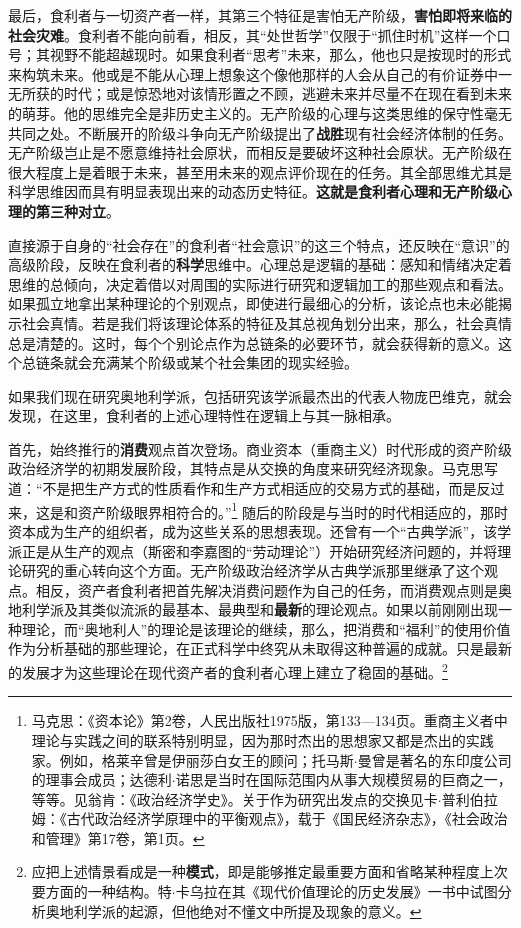 \documentclass[fontset=fandol, a4paper, 12pt, openright]{ctexbook}
\begin{document}
最后，食利者与一切资产者一样，其第三个特征是害怕无产阶级，\textbf{害怕即将来临的社会灾难}。食利者不能向前看，相反，其“处世哲学”仅限于“抓住时机”这样一个口号；其视野不能超越现时。如果食利者“思考”未来，那么，他也只是按现时的形式来构筑未来。他或是不能从心理上想象这个像他那样的人会从自己的有价证券中一无所获的时代；或是惊恐地对该情形置之不顾，逃避未来并尽量不在现在看到未来的萌芽。他的思维完全是非历史主义的。无产阶级的心理与这类思维的保守性毫无共同之处。不断展开的阶级斗争向无产阶级提出了\textbf{战胜}现有社会经济体制的任务。无产阶级岂止是不愿意维持社会原状，而相反是要破坏这种社会原状。无产阶级在很大程度上是着眼于未来，甚至用未来的观点评价现在的任务。其全部思维尤其是科学思维因而具有明显表现出来的动态历史特征。\textbf{这就是食利者心理和无产阶级心理的第三种对立}。

直接源于自身的“社会存在”的食利者“社会意识”的这三个特点，还反映在“意识”的高级阶段，反映在食利者的\textbf{科学}思维中。心理总是逻辑的基础：感知和情绪决定着思维的总倾向，决定着借以对周围的实际进行研究和逻辑加工的那些观点和看法。如果孤立地拿出某种理论的个别观点，即使进行最细心的分析，该论点也未必能揭示社会真情。若是我们将该理论体系的特征及其总视角划分出来，那么，社会真情总是清楚的。这时，每个个别论点作为总链条的必要环节，就会获得新的意义。这个总链条就会充满某个阶级或某个社会集团的现实经验。

如果我们现在研究奥地利学派，包括研究该学派最杰出的代表人物庞巴维克，就会发现，在这里，食利者的上述心理特性在逻辑上与其一脉相承。

首先，始终推行的\textbf{消费}观点首次登场。商业资本（重商主义）时代形成的资产阶级政治经济学的初期发展阶段，其特点是从交换的角度来研究经济现象。马克思写道：“不是把生产方式的性质看作和生产方式相适应的交易方式的基础，而是反过来，这是和资产阶级眼界相符合的。”\footnote{马克思：《资本论》第2卷，人民出版社1975版，第133—134页。重商主义者中理论与实践之间的联系特别明显，因为那时杰出的思想家又都是杰出的实践家。例如，格莱辛曾是伊丽莎白女王的顾问；托马斯$\cdot$曼曾是著名的东印度公司的理事会成员；达德利$\cdot$诺思是当时在国际范围内从事大规模贸易的巨商之一，等等。见翁肯：《政治经济学史》。关于作为研究出发点的交换见卡$\cdot$普利伯拉姆：《古代政治经济学原理中的平衡观点》，载于《国民经济杂志》，《社会政治和管理》第17卷，第1页。} 随后的阶段是与当时的时代相适应的，那时资本成为生产的组织者，成为这些关系的思想表现。还曾有一个“古典学派”，该学派正是从生产的观点（斯密和李嘉图的“劳动理论”）开始研究经济问题的，并将理论研究的重心转向这个方面。无产阶级政治经济学从古典学派那里继承了这个观点。相反，资产者食利者把首先解决消费问题作为自己的任务，而消费观点则是奥地利学派及其类似流派的最基本、最典型和\textbf{最新}的理论观点。如果以前刚刚出现一种理论，而“奥地利人”的理论是该理论的继续，那么，把消费和“福利”的使用价值作为分析基础的那些理论，在正式科学中终究从未取得这种普遍的成就。只是最新的发展才为这些理论在现代资产者的食利者心理上建立了稳固的基础。\footnote{应把上述情景看成是一种\textbf{模式}，即是能够推定最重要方面和省略某种程度上次要方面的一种结构。特$\cdot$卡乌拉在其《现代价值理论的历史发展》一书中试图分析奥地利学派的起源，但他绝对不懂文中所提及现象的意义。}
\end{document}
